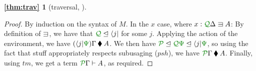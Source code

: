 \documentclass[submission,copyright,creativecommons]{eptcs}
\begin{document}
\newtheorem*{thm:trav}{\autoref{thm:trav}}
\begin{thm:trav}[traversal, ]
  \thmtrav
\end{thm:trav}
\begin{proof}
  By induction on the syntax of $M$. In the  $x$ case,
  where $x : \ctx{\Delta}{Q} \lvar A$: By definition of $\lvar$, we
  have that $\resctx Q \subres \langle j \rvert$ for some $j$.
  Applying the action of the environment, we have
  $(\langle j \rvert\rescomment\Psi)\Gamma \kitrel A$.  We then have
  $\resctx P \subres \resctx Q\rescomment\Psi \subres \langle j
  \rvert\rescomment\Psi$, so using the fact that stuff appropriately
  respects subusaging ($\mathit{psh}$), we have
  $\ctx{\Gamma}{P} \kitrel A$.  Finally, using $\mathit{tm}$, we get a
  term $\ctx{\Gamma}{P} \vdash A$, as required.


\end{proof}
\end{document}
